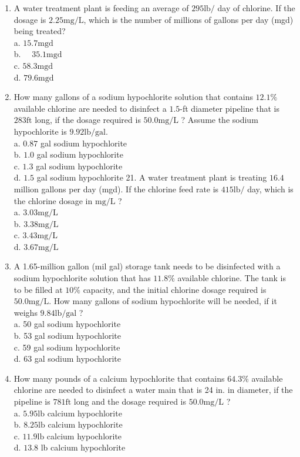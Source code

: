 \documentclass[10pt]{article}
\begin{document}
\begin{enumerate}
  \item A water treatment plant is feeding an average of $295 \mathrm{lb} /$ day of chlorine. If the dosage is $2.25 \mathrm{mg} / \mathrm{L}$, which is the number of millions of gallons per day (mgd) being treated?\\
a. $15.7 \mathrm{mgd}$\\
b. $\quad 35.1 \mathrm{mgd}$\\
c. $58.3 \mathrm{mgd}$\\
d. $79.6 \mathrm{mgd}$

  \item How many gallons of a sodium hypochlorite solution that contains $12.1 \%$ available chlorine are needed to disinfect a $1.5$-ft diameter pipeline that is $283 \mathrm{ft}$ long, if the dosage required is $50.0 \mathrm{mg} / \mathrm{L}$ ? Assume the sodium hypochlorite is $9.92 \mathrm{lb} / \mathrm{gal}$.\\
a. $0.87$ gal sodium hypochlorite\\
b. $1.0$ gal sodium hypochlorite\\
c. $1.3$ gal sodium hypochlorite\\
d. $1.5$ gal sodium hypochlorite 21. A water treatment plant is treating $16.4$ million gallons per day (mgd). If the chlorine feed rate is $415 \mathrm{lb} /$ day, which is the chlorine dosage in $\mathrm{mg} / \mathrm{L}$ ?\\
a. $3.03 \mathrm{mg} / \mathrm{L}$\\
b. $3.38 \mathrm{mg} / \mathrm{L}$\\
c. $3.43 \mathrm{mg} / \mathrm{L}$\\
d. $3.67 \mathrm{mg} / \mathrm{L}$

  \item A 1.65-million gallon (mil gal) storage tank needs to be disinfected with a sodium hypochlorite solution that has $11.8 \%$ available chlorine. The tank is to be filled at $10 \%$ capacity, and the initial chlorine dosage required is $50.0 \mathrm{mg} / \mathrm{L}$. How many gallons of sodium hypochlorite will be needed, if it weighs $9.84 \mathrm{lb} / \mathrm{gal}$ ?\\
a. 50 gal sodium hypochlorite\\
b. 53 gal sodium hypochlorite\\
c. 59 gal sodium hypochlorite\\
d. 63 gal sodium hypochlorite

  \item How many pounds of a calcium hypochlorite that contains $64.3 \%$ available chlorine are needed to disinfect a water main that is 24 in. in diameter, if the pipeline is $781 \mathrm{ft}$ long and the dosage required is $50.0 \mathrm{mg} / \mathrm{L}$ ?\\
a. $5.95 \mathrm{lb}$ calcium hypochlorite\\
b. $8.25 \mathrm{lb}$ calcium hypochlorite\\
c. $11.9 \mathrm{lb}$ calcium hypochlorite\\
d. $13.8$ lb calcium hypochlorite


\end{enumerate}
\end{document}
